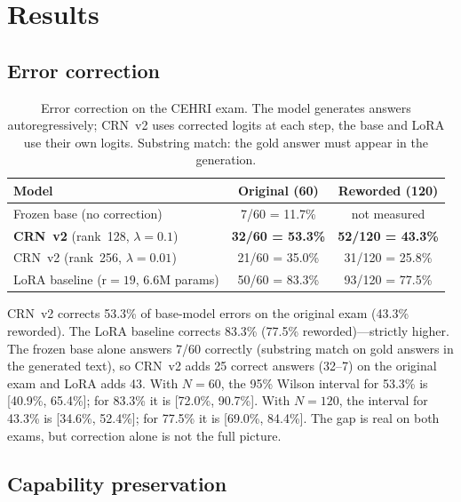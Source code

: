 \documentclass[11pt]{article}
\begin{document}
\section{Results}
\label{sec:results}

\subsection{Error correction}

\begin{table}[ht]
\centering
\small
\caption{Error correction on the CEHRI exam. The model generates answers autoregressively; CRN~v2 uses corrected logits at each step, the base and LoRA use their own logits. Substring match: the gold answer must appear in the generation.}
\begin{tabular}{@{}lcc@{}}
\toprule
Model & Original (60) & Reworded (120) \\
\midrule
Frozen base (no correction) & 7/60 = 11.7\% & not measured \\
\midrule
\textbf{CRN~v2} (rank~128, $\lambda{=}0.1$) & \textbf{32/60 = 53.3\%} & \textbf{52/120 = 43.3\%} \\
CRN~v2 (rank~256, $\lambda{=}0.01$) & 21/60 = 35.0\% & 31/120 = 25.8\% \\
\midrule
LoRA baseline (r${=}19$, 6.6M params) & 50/60 = 83.3\% & 93/120 = 77.5\% \\
\bottomrule
\end{tabular}
\label{tab:correction}
\end{table}

CRN~v2 corrects 53.3\% of base-model errors on the original exam (43.3\% reworded).
The LoRA baseline corrects 83.3\% (77.5\% reworded)---strictly higher.
The frozen base alone answers 7/60 correctly (substring match on gold answers in the generated text), so CRN~v2 adds 25 correct answers (32--7) on the original exam and LoRA adds 43.
With $N{=}60$, the 95\% Wilson interval for 53.3\% is [40.9\%, 65.4\%]; for 83.3\% it is [72.0\%, 90.7\%].
With $N{=}120$, the interval for 43.3\% is [34.6\%, 52.4\%]; for 77.5\% it is [69.0\%, 84.4\%].
The gap is real on both exams, but correction alone is not the full picture.

\subsection{Capability preservation}
\label{sec:capability}
\end{document}
